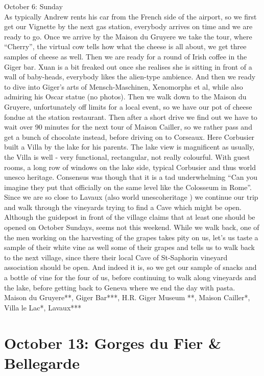 October 6: Sunday\\
As typically Andrew rents his car from the French side of the airport, so we first get our Vignette by the next gas station, everybody arrives on time and we are ready to go. Once we arrive by the Maison du Gruyere we take the tour, where ``Cherry'', the virtual cow tells how what the cheese is all about, we get three samples of cheese as well. Then we are ready for a round of Irish coffee in the Giger bar. Xuan is a bit freaked out once she realises she is sitting in front of a wall of baby-heads, everybody likes the alien-type ambience. And then we ready to dive into Giger's arts of Mensch-Maschinen, Xenomorphs et al, while also admiring his Oscar statue (no photos). Then we walk down to the Maison du Gruyere, unfortunately off limits for a local event, so we have our pot of cheese fondue at the station restaurant. Then after a short drive we find out we have to wait over 90 minutes for the next tour of Maison Cailler, so we rather pass and get a bunch of chocolate instead, before driving on to Corseaux. Here Corbusier built a Villa by the lake for his parents. The lake view is magnificent as usually, the Villa is well - very functional, rectangular, not really colourful. With guest rooms, a long row of windows on the lake side, typical Corbusier and thus world unesco heritage. Consensus was though that it is a tad underwhelming ``Can you imagine they put that officially on the same level like the Colosseum in Rome''. Since we are so close to Lavaux (also world unescoheritage ) we continue our trip and walk through the vineyards trying to find a Cave which might be open. Although the guidepost in front of the village claims that at least one should be opened on October Sundays, seems not this weekend. While we walk back, one of the men working on the harvesting of the grapes takes pity on us, let's us taste a sample of their white vine as well some of their grapes and tells us to walk back to the next village, since there their local Cave of St-Saphorin vineyard association should be open. And indeed it is, so we get our sample of snacks and a bottle of vine for the four of us, before continuing to walk along vineyards and the lake, before getting back to Geneva where we end the day with pasta.\\

Maison du Gruyere**, Giger Bar***, H.R. Giger Museum **, Maison Cailler*, Villa le Lac*, Lavaux***

\section{October 13: Gorges du Fier \& Bellegarde}
\label{Bellegarde2019}


